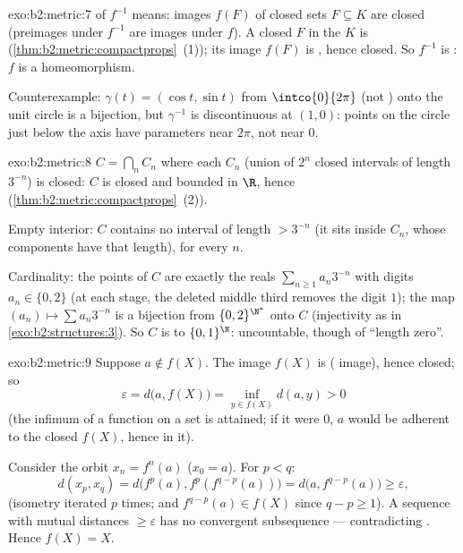 \begin{solution}{exo:b2:metric:7}
 of $f^{-1}$ means: images $f(F)$ of closed sets $F
\subseteq K$ are closed (preimages under $f^{-1}$ are images under
$f$). A closed $F$ in the  $K$ is 
(\cref{thm:b2:metric:compactprops}~(1)); its  image
$f(F)$ is , hence closed. So $f^{-1}$ is : $f$ is
a homeomorphism.

Counterexample: $\gamma(t) = (\cos t, \sin t)$ from
$\intco{0}{2\pi}$ (not ) onto the unit circle is a
 bijection, but $\gamma^{-1}$ is discontinuous at $(1,0)$:
points on the circle just below the axis have parameters near
$2\pi$, not near $0$.
\end{solution}

\begin{solution}{exo:b2:metric:8}
$C = \bigcap_n C_n$ where each $C_n$ (union of $2^n$ closed
intervals of length $3^{-n}$) is closed: $C$ is closed and bounded
in $\R$, hence  (\cref{thm:b2:metric:compactprops}~(2)).

Empty interior: $C$ contains no interval of length $> 3^{-n}$ (it
sits inside $C_n$, whose components have that length), for every
$n$.

Cardinality: the points of $C$ are exactly the reals $\sum_{n\geq1}
a_n 3^{-n}$ with digits $a_n \in \{0, 2\}$ (at each stage, the
deleted middle third removes the digit $1$); the map $(a_n) \mapsto
\sum a_n 3^{-n}$ is a bijection from $\{0,2\}^{\N^*}$ onto $C$
(injectivity as in \cref{exo:b2:structures:3}). So $C$ is 
to $\{0,1\}^{\N}$: uncountable, though of ``length zero''.
\end{solution}

\begin{solution}{exo:b2:metric:9}
Suppose $a \notin f(X)$. The image $f(X)$ is  (
image), hence closed; so
\[
\varepsilon = d\bigl(a, f(X)\bigr)
= \inf_{y \in f(X)} d(a, y) > 0
\]
(the infimum of a  function on a  set is attained;
if it were $0$, $a$ would be adherent to the closed $f(X)$, hence in
it).

Consider the orbit $x_n = f^n(a)$ ($x_0 = a$). For $p < q$:
\[
d(x_p, x_q) = d\bigl(f^p(a), f^p(f^{q-p}(a))\bigr)
= d\bigl(a, f^{q-p}(a)\bigr) \geq \varepsilon,
\]
(isometry iterated $p$ times; and $f^{q-p}(a) \in f(X)$ since $q - p
\geq 1$). A sequence with mutual distances $\geq \varepsilon$ has no
convergent subsequence --- contradicting . Hence $f(X) =
X$.
\end{solution}

